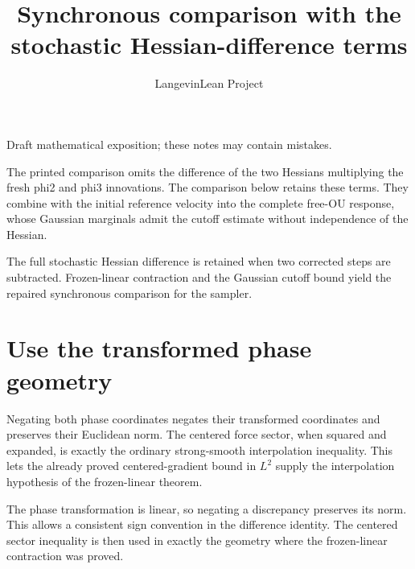\documentclass[11pt,a4paper]{article}
\title{\texorpdfstring{Synchronous comparison with the stochastic Hessian-difference terms}{Synchronous comparison with the stochastic Hessian-difference terms}}
\author{LangevinLean Project}
\date{}
\begin{document}
\maketitle
Draft mathematical exposition; these notes may contain mistakes.


The printed comparison omits the difference of the two Hessians multiplying the fresh phi2 and phi3 innovations. The comparison below retains these terms. They combine with the initial reference velocity into the complete free-OU response, whose Gaussian marginals admit the cutoff estimate without independence of the Hessian.



The full stochastic Hessian difference is retained when two corrected steps are subtracted. Frozen-linear contraction and the Gaussian cutoff bound yield the repaired synchronous comparison for the sampler.


\section{\texorpdfstring{Use the transformed phase geometry}{Use the transformed phase geometry}}


Negating both phase coordinates negates their transformed coordinates and preserves their Euclidean norm. The centered force sector, when squared and expanded, is exactly the ordinary strong-smooth interpolation inequality. This lets the already proved centered-gradient bound in \(L^{2}\) supply the interpolation hypothesis of the frozen-linear theorem.



The phase transformation is linear, so negating a discrepancy preserves its norm. This allows a consistent sign convention in the difference identity. The centered sector inequality is then used in exactly the geometry where the frozen-linear contraction was proved.
\end{document}
